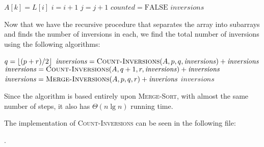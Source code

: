 \begin{itemize}
\begin{algorithmic}[1]
                    \STATE $A[k] = L[i]$
                    \STATE $i = i + 1$
                \ELSE
                    \STATE $j = j + 1$
                    \STATE $\mathit{counted} = \textrm{FALSE}$
                \ENDIF
            \ENDFOR
            \RETURN $\mathit{inversions}$
        \end{algorithmic}

        Now that we have the recursive procedure that separates the array into subarrays
        and finds the number of inversions in each, we find the total number of inversions
        using the following algorithms:
        \begin{algorithmic}[1]
                    \STATE $q = \lfloor(p + r)/2\rfloor$
                    \STATE $\mathit{inversions} 
                        = \textsc{Count-Inversions}(A, p, q, \mathit{inversions}) +
                        \mathit{inversions}$
                    \STATE $\mathit{inversions} 
                        = \textsc{Count-Inversions}(A, q + 1, r, \mathit{inversions}) +
                        \mathit{inversions}$
                    \STATE $\mathit{inversions} 
                        = \textsc{Merge-Inversions}(A, p, q, r) + \mathit{inverions}$
                \ENDIF
                \RETURN $\mathit{inversions}$
        \end{algorithmic}

        Since the algorithm is based entirely upon \textsc{Merge-Sort}, with almost the
        same number of steps, it also has $\Theta(n\lg{n})$ running time.
\end{itemize}

The implementation of \textsc{Count-Inversions} can be seen in the following file:

.
